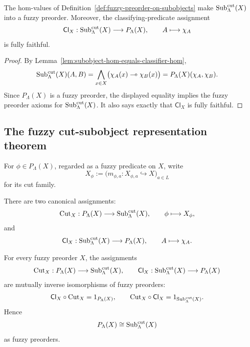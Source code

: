 \begin{proposition}
\label{prop:subobjects-form-fuzzy-preorder}
    The hom-values of Definition~\ref{def:fuzzy-preorder-on-subobjects} make \(\mathrm{Sub}^{\mathrm{cut}}_\Lambda(X)\) into a fuzzy preorder. Moreover, the classifying-predicate assignment
    \[
        \mathsf{Cl}_X:
        \mathrm{Sub}^{\mathrm{cut}}_\Lambda(X)\longrightarrow P_\Lambda(X),
        \qquad
        A\longmapsto\chi_A
    \]
    is fully faithful.
\end{proposition}

\begin{proof}
    By Lemma~\ref{lem:subobject-hom-equals-classifier-hom},
    \[
        \mathrm{Sub}^{\mathrm{cut}}_\Lambda(X)(A,B)
        =
        \bigwedge_{x\in X}
        \bigl(\chi_A(x)\multimap\chi_B(x)\bigr)
        =
        P_\Lambda(X)(\chi_A,\chi_B).
    \]
    Since \(P_\Lambda(X)\) is a fuzzy preorder, the displayed equality implies the fuzzy preorder axioms for \(\mathrm{Sub}^{\mathrm{cut}}_\Lambda(X)\). It also says exactly that \(\mathsf{Cl}_X\) is fully faithful.
\end{proof}

\subsection{The fuzzy cut-subobject representation theorem}
\label{subsec:representation-theorem-and-classification}

For \(\phi\in P_\Lambda(X)\), regarded as a fuzzy predicate on \(X\), write
\[
    X_\phi
    :=
    \bigl(m_{\phi,a}:X_{\phi,a}\hookrightarrow X\bigr)_{a\in L}
\]
for its cut family.

There are two canonical assignments:
\[
    \mathrm{Cut}_X:P_\Lambda(X)\longrightarrow\mathrm{Sub}^{\mathrm{cut}}_\Lambda(X),
    \qquad
    \phi\longmapsto X_\phi,
\]
and
\[
    \mathsf{Cl}_X:\mathrm{Sub}^{\mathrm{cut}}_\Lambda(X)\longrightarrow P_\Lambda(X),
    \qquad
    A\longmapsto\chi_A.
\]

\begin{theorem}
\label{thm:representation-theorem}
    For every fuzzy preorder \(X\), the assignments
    \[
        \mathrm{Cut}_X:P_\Lambda(X)\longrightarrow\mathrm{Sub}^{\mathrm{cut}}_\Lambda(X),
        \qquad
        \mathsf{Cl}_X:\mathrm{Sub}^{\mathrm{cut}}_\Lambda(X)\longrightarrow P_\Lambda(X)
    \]
    are mutually inverse isomorphisms of fuzzy preorders:
    \[
        \mathsf{Cl}_X\circ\mathrm{Cut}_X=1_{P_\Lambda(X)},
        \qquad
        \mathrm{Cut}_X\circ\mathsf{Cl}_X=1_{\mathrm{Sub}^{\mathrm{cut}}_\Lambda(X)}.
    \]
    Hence
    \[
        P_\Lambda(X)\cong\mathrm{Sub}^{\mathrm{cut}}_\Lambda(X)
    \]
    as fuzzy preorders.
\end{theorem}

